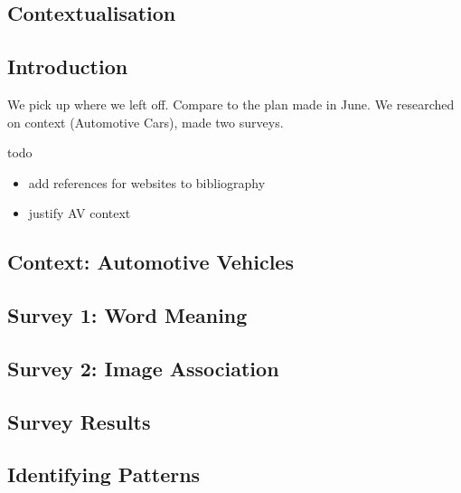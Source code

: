 \documentclass[12pt, usenames, dvipsnames]{report}
\begin{document}
\begin{flushleft}
\chapter{Contextualisation}

\section*{Introduction}

We pick up where we left off. Compare to the plan made in June. We researched on context (Automotive Cars), made two surveys.

todo
\begin{itemize}
	\item add references for websites to bibliography
	\item justify AV context
\end{itemize}


\section{Context: Automotive Vehicles}


\section{Survey 1: Word Meaning}


\section{Survey 2: Image Association}


\section{Survey Results}


\section{Identifying Patterns}





\end{flushleft}
\end{document}
